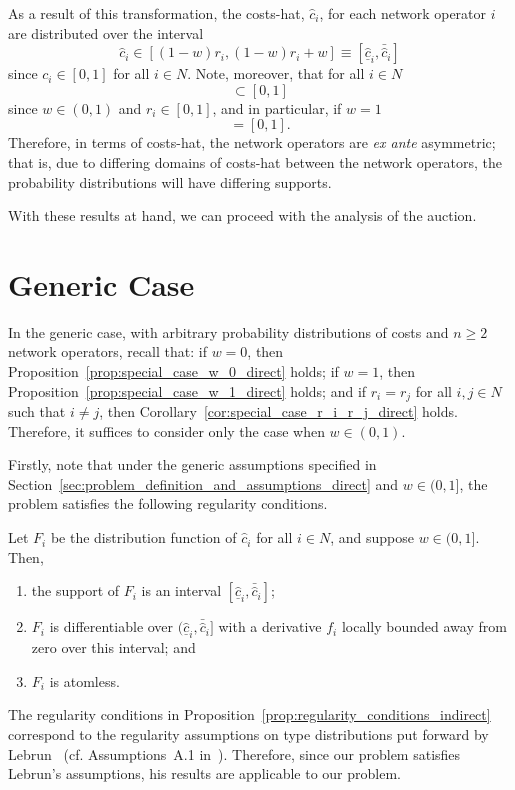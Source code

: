 As a result of this transformation, the costs-hat, $\hat{c}_i$, for each network operator $i$ are distributed over the interval
\begin{equation*}
  \hat{c}_i\in [(1-w)r_i, (1-w)r_i + w]\equiv [\underline{\hat{c}}_i, \bar{\hat{c}}_i]
\end{equation*}
since $c_i\in [0,1]$ for all $i\in N$. Note, moreover, that for all $i\in N$
\begin{equation*}
  [\underline{\hat{c}}_i, \bar{\hat{c}}_i] \subset [0,1]
\end{equation*}
since $w\in (0,1)$ and $r_i\in [0,1]$, and in particular, if $w=1$
\begin{equation*}
  [\underline{\hat{c}}_i, \bar{\hat{c}}_i] = [0,1].
\end{equation*}
Therefore, in terms of costs-hat, the network operators are \emph{ex ante} asymmetric; that is, due to differing domains of costs-hat between the network operators, the probability distributions will have differing supports.

With these results at hand, we can proceed with the analysis of the auction.

\section{Generic Case} %
\label{sec:generic_case_indirect}
In the generic case, with arbitrary probability distributions of costs and $n\ge 2$ network operators, recall that: if $w=0$, then Proposition~\ref{prop:special_case_w_0_direct} holds; if $w=1$, then Proposition~\ref{prop:special_case_w_1_direct} holds; and if $r_i=r_j$ for all $i,j\in N$ such that $i\neq j$, then Corollary~\ref{cor:special_case_r_i_r_j_direct} holds. Therefore, it suffices to consider only the case when $w\in (0,1)$.

Firstly, note that under the generic assumptions specified in Section~\ref{sec:problem_definition_and_assumptions_direct} and $w\in (0,1]$, the problem satisfies the following regularity conditions.
\begin{proposition}
\label{prop:regularity_conditions_indirect}
Let $F_i$ be the distribution function of $\hat{c}_i$ for all $i\in N$, and suppose $w\in (0,1]$. Then,
\begin{enumerate}
  \item the support of $F_i$ is an interval ${[\underline{\hat{c}}_i, \bar{\hat{c}}_i]}$;
  \item $F_i$ is differentiable over ${(\underline{\hat{c}}_i, \bar{\hat{c}}_i]}$ with a derivative $f_i$ locally bounded away from zero over this interval; and
  \item $F_i$ is atomless.
\end{enumerate}
\end{proposition}
The regularity conditions in Proposition~\ref{prop:regularity_conditions_indirect} correspond to the regularity assumptions on type distributions put forward by Lebrun~\cite{Lebrun2006} (cf. Assumptions~A.1 in~\cite{Lebrun2006}). Therefore, since our problem satisfies Lebrun's assumptions, his results are applicable to our problem.

